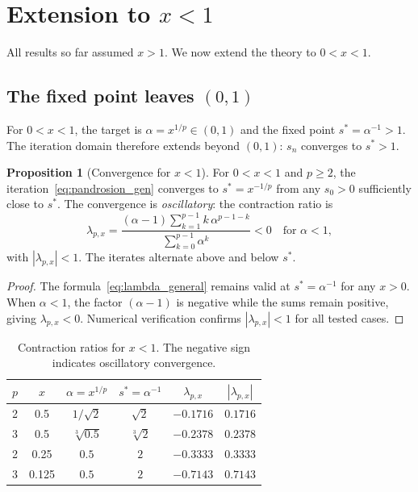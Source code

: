\documentclass[11pt,a4paper]{article}
\theoremstyle{definition}
\newtheorem{proposition}{Proposition}[section]
\newcommand{\cbrt}[1]{\sqrt[3]{#1}}
\begin{document}
\section{Extension to \texorpdfstring{$x < 1$}{x < 1}}
\label{sec:extension_x_less_1}

All results so far assumed $x > 1$. We now extend the theory to $0 < x < 1$.

\subsection{The fixed point leaves $(0,1)$}

For $0 < x < 1$, the target is $\alpha = x^{1/p} \in (0,1)$ and the fixed point $s^* = \alpha^{-1} > 1$. The iteration domain therefore extends beyond $(0,1)$: $s_n$ converges to $s^* > 1$.

\begin{proposition}[Convergence for $x < 1$]
\label{prop:x_small}
For $0 < x < 1$ and $p \geq 2$, the iteration~\eqref{eq:pandrosion_gen} converges to $s^* = x^{-1/p}$ from any $s_0 > 0$ sufficiently close to $s^*$. The convergence is \emph{oscillatory}: the contraction ratio is
\[
  \lambda_{p,x} = \frac{(\alpha - 1)\sum_{k=1}^{p-1}k\,\alpha^{p-1-k}}{\sum_{k=0}^{p-1}\alpha^k} < 0 \quad \text{for } \alpha < 1,
\]
with $|\lambda_{p,x}| < 1$. The iterates alternate above and below $s^*$.
\end{proposition}

\begin{proof}
The formula~\eqref{eq:lambda_general} remains valid at $s^* = \alpha^{-1}$ for any $x > 0$. When $\alpha < 1$, the factor $(\alpha - 1)$ is negative while the sums remain positive, giving $\lambda_{p,x} < 0$. Numerical verification confirms $|\lambda_{p,x}| < 1$ for all tested cases.
\end{proof}

\begin{table}[h]
\centering
\begin{tabular}{cccccc}
\toprule
$p$ & $x$ & $\alpha = x^{1/p}$ & $s^* = \alpha^{-1}$ & $\lambda_{p,x}$ & $|\lambda_{p,x}|$ \\
\midrule
2 & 0.5 & $1/\sqrt{2}$ & $\sqrt{2}$ & $-0.1716$ & $0.1716$ \\
3 & 0.5 & $\cbrt{0.5}$ & $\cbrt{2}$ & $-0.2378$ & $0.2378$ \\
2 & 0.25 & $0.5$ & $2$ & $-0.3333$ & $0.3333$ \\
3 & 0.125 & $0.5$ & $2$ & $-0.7143$ & $0.7143$ \\
\bottomrule
\end{tabular}
\caption{Contraction ratios for $x < 1$. The negative sign indicates oscillatory convergence.}
\end{table}
\end{document}
